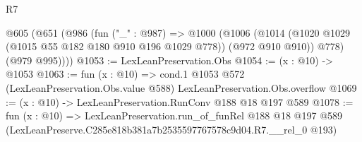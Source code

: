 \begin{lexlean}{R7}
\begin{coremodule}
  @605
    (@651
      (@986
        (fun ("_" : @987) =>
        @1000
          (@1006
            (@1014 (@1020 @1029 (@1015 @55 @182 @180 @910 @196 @1029 @778)) (@972 @910 @910))
            @778)
          (@979 @995))))
@1053 := LexLeanPreservation.Obs
@1054 := (x : @10) -> @1053
@1063 := fun (x : @10) =>
  cond.{1} @1053 @572 (LexLeanPreservation.Obs.value @588) LexLeanPreservation.Obs.overflow
@1069 := (x : @10) -> LexLeanPreservation.RunConv @188 @18 @197 @589
@1078 := fun (x : @10) =>
  LexLeanPreservation.run_of_funRel
    @188
    @18
    @197
    @589
    (LexLeanPreserve.C285e818b381a7b2535597767578c9d04.R7.__rel_0 @193)
\end{coremodule}
\end{lexlean}
